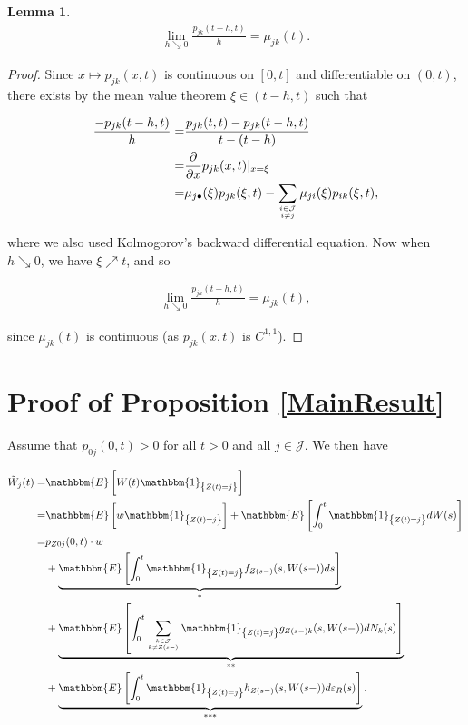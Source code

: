 \documentclass{article}
\newcommand{\1}[1]{\mathbbm{1}_{\left\lbrace #1 \right\rbrace}}
\newcommand{\expec}[1][def]{\mathbbm{E} \left[ #1 \right]}
\theoremstyle{break}
\newtheorem{lemma}[definition]{Lemma}
\theoremstyle{remark}
\numberwithin{equation}{section}
\begin{document}
\begin{appendices}
\begin{lemma}
	\begin{align*}
		\lim_{h \searrow 0} \frac{p_{jk}(t-h,t)}{h} = \mu_{jk}(t).
	\end{align*}
\end{lemma}
\begin{proof}
	Since $x \mapsto p_{jk}(x,t)$ is continuous on $[0,t]$ and differentiable on $(0,t)$, there exists by the mean value theorem $\xi \in ( t-h, t)$ such that
	
	\begin{align*}
		\frac{-p_{jk}(t-h,t)}{h} =& \frac{p_{jk}(t,t)-p_{jk}(t-h,t)}{t-(t-h)} \\
		=& \frac{\partial}{\partial x} p_{jk}(x,t)|_{x=\xi} \\
		=& \mu_{j \bullet}(\xi) p_{jk}(\xi,t) - \sum_{i \in \mathcal{J} \atop i \neq j} \mu_{ji}(\xi) p_{ik}(\xi,t),
	\end{align*}
	
	where we also used Kolmogorov's backward differential equation. Now when $h \searrow 0$, we have $\xi \nearrow t$, and so
	
	\begin{align*}
		\lim_{h \searrow 0} \frac{p_{jk}(t-h,t)}{h} = \mu_{jk}(t),
	\end{align*}
	
	since $\mu_{jk}(t)$ is continuous (as $p_{jk}(x,t)$ is $C^{1,1}$).
\end{proof}

\newpage

\section{Proof of Proposition \ref{MainResult}} \label{MainProof}

Assume that $p_{0j}(0,t)>0$ for all $t>0$ and all $j \in \mathcal{J}$. We then have

\begin{align*}
    \tilde{W}_j(t) =& \expec[W(t) \1{Z(t)=j}] \\
    =& \expec[w \1{Z(t)=j}] + \expec[\int_0^t \1{Z(t)=j} dW(s)] \\
    =& p_{Z0j}(0,t) \cdot w \\
    &+ \underbrace{\expec[\int_0^t \1{Z(t)=j} f_{Z(s-)}(s,W(s-)) ds]}_* \\
    &+ \underbrace{\expec[\int_0^t \sum_{k \in \mathcal{J} \atop k \neq Z(s-)} \1{Z(t)=j} g_{Z(s-)k}(s,W(s-)) dN_k(s)]}_{**} \\
    &+ \underbrace{\expec[\int_0^t \1{Z(t)=j} h_{Z(s-)}(s,W(s-)) d \varepsilon_{R}(s)]}_{***}.
\end{align*}


\end{appendices}
\end{document}
